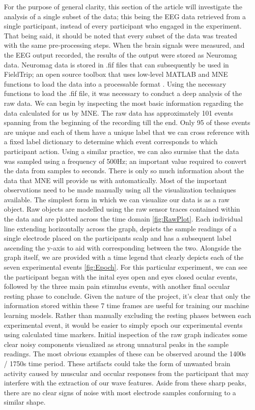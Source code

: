 \documentclass[11pt]{article}
\begin{document}
For the purpose of general clarity, this section of the article will investigate the analysis of a single subset of the data; this being the EEG data retrieved from a single participant, instead of every participant who engaged in the experiment. That being said, it should be noted that every subset of the data was treated with the same pre-processing steps. When the brain signals were measured, and the EEG output recorded, the results of the output were stored as Neuromag data. Neuromag data is stored in .fif files that can subsequently be used in FieldTrip; an open source toolbox that uses low-level MATLAB and MNE functions to load the data into a processable format \cite{Oostenveld2011-nu}. Using the necessary functions to load the .fif file, it was necessary to conduct a deep analysis of the raw data. We can begin by inspecting the most basic information regarding the data calculated for us by MNE. The raw data has approximately 101 events spanning from the beginning of the recording till the end. Only 95 of these events are unique and each of them have a unique label that we can cross reference with a fixed label dictionary to determine which event corresponds to which participant action. Using a similar practice, we can also surmise that the data was sampled using a frequency of 500Hz; an important value required to convert the data from samples to seconds. There is only so much information about the data that MNE will provide us with automatically. Most of the important observations need to be made manually using all the visualization techniques available. The simplest form in which we can visualize our data is as a raw object. Raw objects are modelled using the raw sensor traces contained within the data and are plotted across the time domain \ref{fig:RawPlot}. Each individual line extending horizontally across the graph, depicts the sample readings of a single electrode placed on the participants scalp and has a subsequent label ascending the y-axis to aid with corresponding between the two. Alongside the graph itself, we are provided with a time legend that clearly depicts each of the seven experimental events \ref{fig:Epoch}. For this particular experiment, we can see the participant began with the inital eyes open and eyes closed ocular events, followed by the three main pain stimulus events, with another final occular resting phase to conclude. Given the nature of the project, it's clear that only the information stored within these 7 time frames are useful for training our machine learning models. Rather than manually excluding the resting phases between each experimental event, it would be easier to simply epoch our experimental events using calculated time markers. Initial inspection of the raw graph indicates some clear noisy components visualized as strong unnatural peaks in the sample readings. The most obvious examples of these can be observed around the 1400s / 1750s time period. These artifacts could take the form of unwanted brain activity caused by muscular and occular responses from the participant that may interfere with the extraction of our wave features. Aside from these sharp peaks, there are no clear signs of noise with most electrode samples conforming to a similar shape. 
\end{document}

